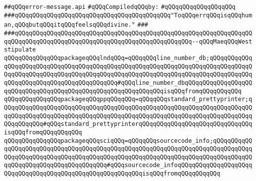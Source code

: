 \label{src/lib/compiler/front/basics/errormsg/error-message.api}
\verb|##qQQqerror-message.api|\newline
\newline
\verb|#qQQqCompiledqQQqby:|\newline
\verb|#qQQqqQQqqQQqqQQqqQQq|\newline
\newline
\newline
\newline
\verb|###qQQqqQQqqQQqqQQqqQQqqQQqqQQqqQQqqQQqqQQqqQQq"ToqQQqerrqQQqisqQQqhuman,qQQqbutqQQqitqQQqfeelsqQQqdivine."|\newline
\verb|###|\newline
\verb|###qQQqqQQqqQQqqQQqqQQqqQQqqQQqqQQqqQQqqQQqqQQqqQQqqQQqqQQqqQQqqQQqqQQqqQQqqQQqqQQqqQQqqQQqqQQqqQQqqQQqqQQqqQQqqQQqqQQqqQQq--qQQqMaeqQQqWest|\newline
\newline
\newline
\verb|stipulate|\newline
\verb|qQQqqQQqqQQqqQQqpackageqQQqlndqQQq=qQQqqQQqline_number_db;qQQqqQQqqQQqqQQqqQQqqQQqqQQqqQQqqQQqqQQqqQQqqQQqqQQqqQQqqQQqqQQqqQQqqQQqqQQqqQQqqQQqqQQqqQQqqQQqqQQqqQQqqQQqqQQqqQQqqQQqqQQqqQQqqQQqqQQqqQQqqQQqqQQqqQQqqQQqqQQqqQQqqQQqqQQqqQQqqQQqqQQq#qQQqline_number_dbqQQqqQQqqQQqqQQqqQQqqQQqqQQqqQQqqQQqqQQqqQQqqQQqqQQqqQQqqQQqqQQqisqQQqfromqQQqqQQqqQQq|\newline
\verb|qQQqqQQqqQQqqQQqpackageqQQqppqQQqqQQq=qQQqqQQqstandard_prettyprinter;qQQqqQQqqQQqqQQqqQQqqQQqqQQqqQQqqQQqqQQqqQQqqQQqqQQqqQQqqQQqqQQqqQQqqQQqqQQqqQQqqQQqqQQqqQQqqQQqqQQqqQQqqQQqqQQqqQQqqQQqqQQqqQQqqQQqqQQqqQQqqQQqqQQqqQQq#qQQqstandard_prettyprinterqQQqqQQqqQQqqQQqqQQqqQQqqQQqqQQqisqQQqfromqQQqqQQqqQQq|\newline
\verb|qQQqqQQqqQQqqQQqpackageqQQqsciqQQq=qQQqqQQqsourcecode_info;qQQqqQQqqQQqqQQqqQQqqQQqqQQqqQQqqQQqqQQqqQQqqQQqqQQqqQQqqQQqqQQqqQQqqQQqqQQqqQQqqQQqqQQqqQQqqQQqqQQqqQQqqQQqqQQqqQQqqQQqqQQqqQQqqQQqqQQqqQQqqQQqqQQqqQQqqQQqqQQqqQQqqQQqqQQqqQQqqQQq#qQQqsourcecode_infoqQQqqQQqqQQqqQQqqQQqqQQqqQQqqQQqqQQqqQQqqQQqqQQqqQQqqQQqqQQqisqQQqfromqQQqqQQqqQQq|\newline

